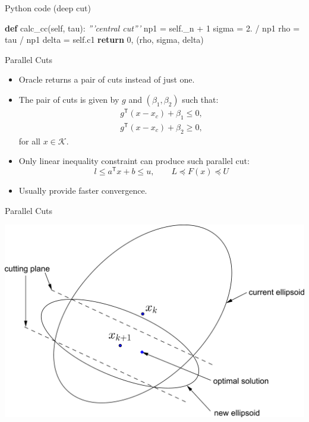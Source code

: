 \documentclass[10pt,ignorenonframetext,serif,onlymath]{beamer}
\newenvironment{Shaded}{}{}
\newcommand{\CommentTok}[1]{\textcolor[rgb]{0.38,0.63,0.69}{\textit{#1}}}
\newcommand{\ControlFlowTok}[1]{\textcolor[rgb]{0.00,0.44,0.13}{\textbf{#1}}}
\newcommand{\DecValTok}[1]{\textcolor[rgb]{0.25,0.63,0.44}{#1}}
\newcommand{\FloatTok}[1]{\textcolor[rgb]{0.25,0.63,0.44}{#1}}
\newcommand{\KeywordTok}[1]{\textcolor[rgb]{0.00,0.44,0.13}{\textbf{#1}}}
\newcommand{\NormalTok}[1]{#1}
\newcommand{\OperatorTok}[1]{\textcolor[rgb]{0.40,0.40,0.40}{#1}}
\newcommand{\VariableTok}[1]{\textcolor[rgb]{0.10,0.09,0.49}{#1}}
\begin{document}
\begin{frame}[fragile]{Python code (deep cut)}
\protect\hypertarget{python-code-deep-cut-1}{}

\begin{Shaded}
\begin{Highlighting}[]
\KeywordTok{def}\NormalTok{ calc_cc(}\VariableTok{self}\NormalTok{, tau):}
    \CommentTok{'''central cut'''}
\NormalTok{    np1 }\OperatorTok{=} \VariableTok{self}\NormalTok{._n }\OperatorTok{+} \DecValTok{1}
\NormalTok{    sigma }\OperatorTok{=} \FloatTok{2.} \OperatorTok{/}\NormalTok{ np1}
\NormalTok{    rho }\OperatorTok{=}\NormalTok{ tau }\OperatorTok{/}\NormalTok{ np1}
\NormalTok{    delta }\OperatorTok{=} \VariableTok{self}\NormalTok{.c1}
    \ControlFlowTok{return} \DecValTok{0}\NormalTok{, (rho, sigma, delta)}
\end{Highlighting}
\end{Shaded}

\end{frame}

\begin{frame}{Parallel Cuts}
\protect\hypertarget{parallel-cuts}{}

\begin{itemize}
\item
  Oracle returns a pair of cuts instead of just one.
\item
  The pair of cuts is given by \(g\) and \((\beta_1, \beta_2)\) such
  that: \[\begin{array}{l}
  g^\mathsf{T} (x - x_c) + \beta_1 \leq 0,  \\
  g^\mathsf{T} (x - x_c) + \beta_2 \geq 0,
  \end{array}\] for all \(x \in \mathcal{K}\).
\item
  Only linear inequality constraint can produce such parallel cut:
  \[ l \leq a^\mathsf{T} x + b \leq u, \qquad L \preceq F(x) \preceq U \]
\item
  Usually provide faster convergence.
\end{itemize}

\end{frame}

\begin{frame}{Parallel Cuts}
\protect\hypertarget{parallel-cuts-1}{}

\includegraphics{ellipsoid.files/parallel_cut.pdf}

\end{frame}
\end{document}
